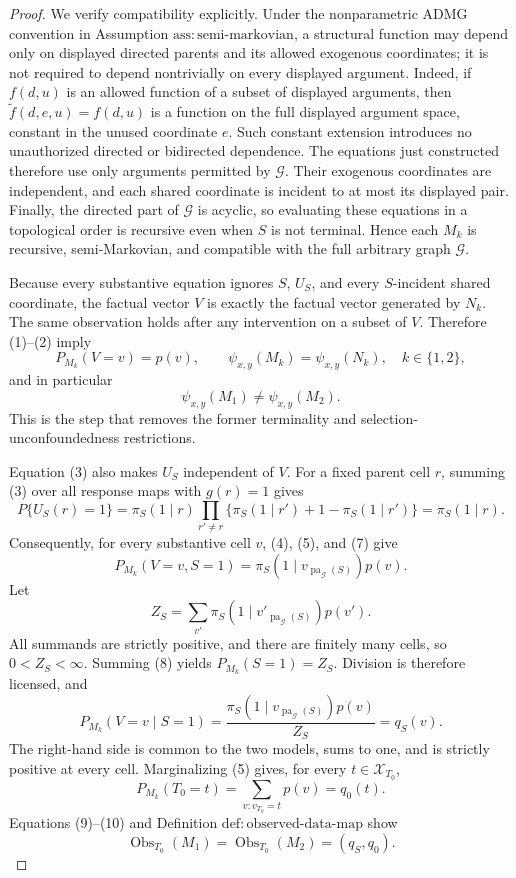 \documentclass{article}
\begin{document}
\begin{proof}
We verify compatibility explicitly. Under the nonparametric ADMG convention in Assumption \(\mathrm{ass{:}semi\text{-}markovian}\), a structural function may depend only on displayed directed parents and its allowed exogenous coordinates; it is not required to depend nontrivially on every displayed argument. Indeed, if \(f(d,u)\) is an allowed function of a subset of displayed arguments, then \(\widetilde f(d,e,u)=f(d,u)\) is a function on the full displayed argument space, constant in the unused coordinate \(e\). Such constant extension introduces no unauthorized directed or bidirected dependence. The equations just constructed therefore use only arguments permitted by \(\mathcal G\). Their exogenous coordinates are independent, and each shared coordinate is incident to at most its displayed pair. Finally, the directed part of \(\mathcal G\) is acyclic, so evaluating these equations in a topological order is recursive even when \(S\) is not terminal. Hence each \(M_k\) is recursive, semi-Markovian, and compatible with the full arbitrary graph \(\mathcal G\).

Because every substantive equation ignores \(S\), \(U_S\), and every \(S\)-incident shared coordinate, the factual vector \(V\) is exactly the factual vector generated by \(N_k\). The same observation holds after any intervention on a subset of \(V\). Therefore (1)--(2) imply
\[
 P_{M_k}(V=v)=p(v),
 \qquad
 \psi_{x,y}(M_k)=\psi_{x,y}(N_k),
 \quad k\in\{1,2\},
 \tag{5}
\]
and in particular
\[
 \psi_{x,y}(M_1)\ne\psi_{x,y}(M_2).
 \tag{6}
\]
This is the step that removes the former terminality and selection-unconfoundedness restrictions.

Equation (3) also makes \(U_S\) independent of \(V\). For a fixed parent cell \(r\), summing (3) over all response maps with \(g(r)=1\) gives
\[
 P\{U_S(r)=1\}
 =\pi_S(1\mid r)
 \prod_{r'\ne r}\{\pi_S(1\mid r')+1-\pi_S(1\mid r')\}
 =\pi_S(1\mid r).
 \tag{7}
\]
Consequently, for every substantive cell \(v\), (4), (5), and (7) give
\[
 P_{M_k}(V=v,S=1)
 =\pi_S(1\mid v_{\operatorname{pa}_{\mathcal G}(S)})p(v).
 \tag{8}
\]
Let
\[
 Z_S=\sum_{v'}\pi_S(1\mid v'_{\operatorname{pa}_{\mathcal G}(S)})p(v').
\]
All summands are strictly positive, and there are finitely many cells, so \(0<Z_S<\infty\). Summing (8) yields \(P_{M_k}(S=1)=Z_S\). Division is therefore licensed, and
\[
 P_{M_k}(V=v\mid S=1)
 =\frac{\pi_S(1\mid v_{\operatorname{pa}_{\mathcal G}(S)})p(v)}{Z_S}
 =q_S(v).
 \tag{9}
\]
The right-hand side is common to the two models, sums to one, and is strictly positive at every cell. Marginalizing (5) gives, for every \(t\in\mathcal X_{T_0}\),
\[
 P_{M_k}(T_0=t)
 =\sum_{v:v_{T_0}=t}p(v)
 =q_0(t).
 \tag{10}
\]
Equations (9)--(10) and Definition \(\mathrm{def{:}observed\text{-}data\text{-}map}\) show
\[
 \operatorname{Obs}_{T_0}(M_1)
 =\operatorname{Obs}_{T_0}(M_2)
 =(q_S,q_0).
 \tag{11}
\]


\end{proof}
\end{document}
